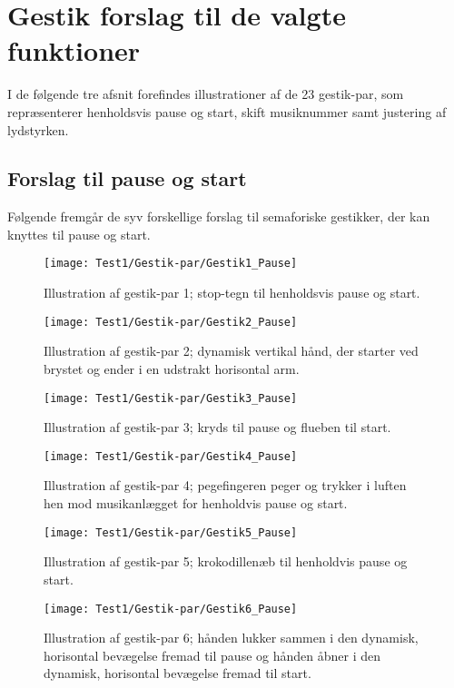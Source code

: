 \chapter{Gestik forslag til de valgte funktioner}
\label{app:GestikForslagFunktioner}
%
I de følgende tre afsnit forefindes illustrationer af de 23 gestik-par, som repræsenterer henholdsvis pause og start, skift musiknummer samt justering af lydstyrken.
%
\section{Forslag til pause og start}
\label{app:ForslagPauseOgStart}
%
Følgende fremgår de syv forskellige forslag til semaforiske gestikker, der kan knyttes til pause og start.
%
\begin{figure}[H]
	\centering
	\texttt{[image: Test1/Gestik-par/Gestik1\_Pause]}
	\caption{Illustration af gestik-par 1; stop-tegn til henholdsvis pause og start.}
	\label{fig:GestikPar1PauseApp}
\end{figure}
\noindent
%
%
\begin{figure}[H]
	\centering
	\texttt{[image: Test1/Gestik-par/Gestik2\_Pause]}
	\caption{Illustration af gestik-par 2; dynamisk vertikal hånd, der starter ved brystet og ender i en udstrakt horisontal arm.}
	\label{fig:GestikPar2PauseApp}
\end{figure}
\noindent
%
%
\begin{figure}[H]
	\centering
	\texttt{[image: Test1/Gestik-par/Gestik3\_Pause]}
	\caption{Illustration af gestik-par 3; kryds til pause og flueben til start.}
	\label{fig:GestikPar3PauseApp}
\end{figure}
\noindent
%
%
\begin{figure}[H]
	\centering
	\texttt{[image: Test1/Gestik-par/Gestik4\_Pause]}
	\caption{Illustration af gestik-par 4; pegefingeren peger og trykker i luften hen mod musikanlægget for henholdvis pause og start.}
	\label{fig:GestikPar4PauseApp}
\end{figure}
\noindent
%
%
\begin{figure}[H]
	\centering
	\texttt{[image: Test1/Gestik-par/Gestik5\_Pause]}
	\caption{Illustration af gestik-par 5; krokodillenæb til henholdvis pause og start.}
	\label{fig:GestikPar5PauseApp}
\end{figure}
\noindent
%
%
\begin{figure}[H]
	\centering
	\texttt{[image: Test1/Gestik-par/Gestik6\_Pause]}
	\caption{Illustration af gestik-par 6; hånden lukker sammen i den dynamisk, horisontal bevægelse fremad til pause og hånden åbner i den dynamisk, horisontal bevægelse fremad til start.}
	\label{fig:GestikPar6PauseApp}
\end{figure}
